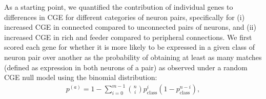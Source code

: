 \documentclass[10pt,letterpaper]{article}
\begin{document}
As a starting point, we quantified the contribution of individual genes to differences in CGE for different categories of neuron pairs, specifically for (i) increased CGE in connected compared to unconnected pairs of neurons, and (ii) increased CGE in rich and feeder compared to peripheral connections.
We first scored each gene for whether it is more likely to be expressed in a given class of neuron pair over another as the probability of obtaining at least as many matches (defined as expression in both neurons of a pair) as observed under a random CGE null model using the binomial distribution:
\begin{eqnarray}
	\label{eq:CBinomialProbability}
     p^{(a)} = 1 - \sum_{i=0}^{m-1}\binom{n}{i} p_\mathrm{class}^{i}(1-p_\mathrm{class}^{n-i}),
\end{eqnarray}
\end{document}
